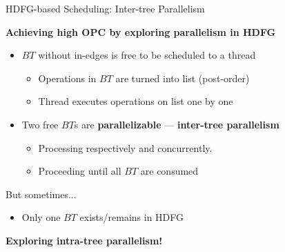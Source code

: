 \documentclass{beamer}
\begin{document}
\begin{CJK}{UTF8}{bkai}
            \begin{frame}{HDFG-based Scheduling: Inter-tree Parallelism}
                \pause
                \begin{center}
                \textbf{Achieving high OPC by exploring parallelism in HDFG}
                \end{center}
                \begin{itemize}
                        \pause
                    \item {$BT$ without in-edges is free to be scheduled to a thread
                            \begin{itemize}
                                \item Operations in $BT$ are turned into list (post-order)
                                \item Thread executes operations on list one by one
                            \end{itemize}
                        }
                        \pause
                    \item {Two free $BT$s are \textbf{parallelizable} --- \textbf{inter-tree parallelism}
                            \begin{itemize}
                                \item Processing respectively and concurrently.
                                \item Proceeding until all $BT$ are consumed
                            \end{itemize}
                        }
                \end{itemize}
                \pause
                But sometimes...
                \begin{itemize}
                    \pause
                    \item {Only one $BT$ exists/remains in HDFG}
                \end{itemize}
                \pause
                \begin{center}
                \large{{\textbf{Exploring intra-tree parallelism!}}}
                \end{center}
            \end{frame}


\end{CJK}
\end{document}
